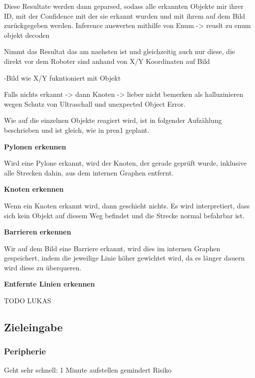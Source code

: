 Diese Resultate werden dann geparsed, sodass alle erkannten Objekte mir ihrer ID, mit der Confidence mit der sie erkannt wurden und mit ihrem auf dem Bild zurückgegeben werden.
Inference auswerten mithilfe von Enum -> reuslt zu enum objekt decoden

Nimmt das Resultat das am naehsten ist und gleichzeitig auch nur diese, die direkt vor dem Roboter sind anhand von X/Y Koordinaten auf Bild

-Bild wie X/Y fukntioniert mit Objekt

Falls nichts erkannt -> dann Knoten -> lieber nicht bemerken als halluzinieren wegen Schutz von Ultraschall und unexpected Object Error.


Wie auf die einzelnen Objekte reagiert wird, ist in folgender Aufzählung beschrieben und ist gleich, wie in \acrshort{pren1} geplant.

\textbf{Pylonen erkennen}

Wird eine Pylone erkannt, wird der Knoten, der gerade geprüft wurde, inklusive alle Strecken dahin, aus dem internen Graphen entfernt.

\textbf{Knoten erkennen}

Wenn ein Knoten erkannt wird, dann geschieht nichts. Es wird interpretiert, dass sich kein Objekt auf diesem Weg befindet und die Strecke normal befahrbar ist.

\textbf{Barrieren erkennen}

Wir auf dem Bild eine Barriere erkannt, wird dies im internen Graphen gespeichert, indem die jeweilige Linie höher gewichtet wird, da es länger dauern wird diese zu überqueren.

\textbf{Entfernte Linien erkennen}

TODO LUKAS

\newpage
\subsection{Zieleingabe}

\subsubsection{Peripherie}
\label{zieleingabe}

Geht sehr schnell: 1 Minute aufstellen gemindert Risiko